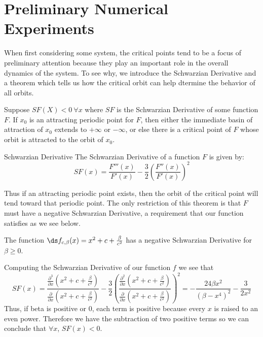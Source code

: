 \section{Preliminary Numerical Experiments}\label{res:prelim}

		When first considering some system, the critical points tend to be a focus of preliminary attention because they play an important role in the overall dynamics of the system. To see why, we introduce the Schwarzian Derivative and a theorem which tells us how the critical orbit can help dtermine the behavior of all orbits.

		\begin{myth}\label{sch}
			Suppose $SF (X) < 0 \ \forall x$ where $SF$ is the Schwarzian Derivative of some function $F$. If $x_0$ is an attracting periodic point for $F$, then either the immediate basin of attraction of $x_0$ extends to $+\infty$ or $-\infty$, or else there is a critical point of $F$ whose orbit is attracted to the orbit of $x_0$\cite{Dev1}.
		\end{myth}

		\begin{mydef}{Schwarzian Derivative\cite{Dev1} }
		The Schwarzian Derivative of a function $F$ is given by:
		\[
			SF (x) = \frac{F''' (x)}{F' (x)} - \frac{3}{2} \left (\frac{F'' (x)}{F' (x)}\right)^2
		\]
		\end{mydef}

		Thus if an attracting periodic point exists, then the orbit of the critical point will tend toward that periodic point. The only restriction of this theorem is that $F$ must have a negative Schwarzian Derivative, a requirement that our function satisfies as we see below.

		\begin{myprop}
			The function $\ds f_{c, \beta} (x) = x^2 + c + \frac{\beta}{c^2}$ has a negative Schwarzian Derivative for $\beta \geq 0$.
		\end{myprop}

		\begin{myproof}
			Computing the Schwarzian Derivative of our function $f$ we see that 
			\[
				SF (x) = \frac{\frac{\partial^3}{\partial x} \left (x^2 + c + \frac{\beta}{c^2}\right)}{\frac{\partial}{\partial x} \left (x^2 + c + \frac{\beta}{c^2}\right)} - \frac{3}{2} \left (\frac{\frac{\partial^2}{\partial x} \left (x^2 + c + \frac{\beta}{c^2}\right)}{\frac{\partial}{\partial x} \left (x^2 + c + \frac{\beta}{c^2}\right)}\right)^2 = -\frac{24 \beta x^2}{\left (\beta-x^4\right)^2}-\frac{3}{2 x^2}
			\]
			Thus, if beta is positive or 0, each term is positive because every $x$ is raised to an even power. Therefore we have the subtraction of two positive terms so we can conclude that $\forall x$, $SF (x) < 0$.
		\end{myproof}


